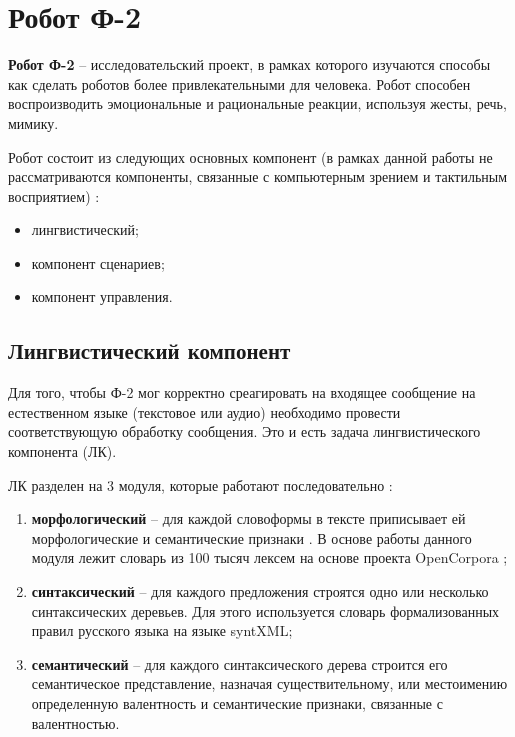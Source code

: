 \chapter{Робот Ф-2}

\textbf{Робот Ф-2} -- исследовательский проект, в рамках которого изучаются способы как сделать роботов более привлекательными для человека. Робот способен воспроизводить эмоциональные и рациональные реакции, используя жесты, речь, мимику. 

Робот состоит из следующих основных компонент (в рамках данной работы не рассматриваются компоненты, связанные с компьютерным зрением и тактильным восприятием) \cite{arch_of_the_robot}:

\begin{itemize}
	\item лингвистический;
	\item компонент сценариев;
	\item компонент управления.
\end{itemize}




\section{Лингвистический компонент}

Для того, чтобы Ф-2 мог корректно среагировать на входящее сообщение на естественном языке (текстовое или аудио) необходимо провести соответствующую обработку сообщения. Это и есть задача лингвистического компонента (ЛК).

ЛК разделен на 3 модуля, которые работают последовательно \cite{arch_of_the_robot}: 

\begin{enumerate}
	\item \textbf{морфологический} -- для каждой словоформы в тексте приписывает ей морфологические и семантические признаки \cite{arch_of_the_robot_2}. В основе работы данного модуля лежит словарь из 100 тысяч лексем на основе проекта OpenCorpora \cite{arch_of_the_robot_3};
	
	\item \textbf{синтаксический} -- для каждого предложения строятся одно или несколько синтаксических деревьев. Для этого используется словарь формализованных правил русского языка на языке syntXML;
	
	\item \textbf{семантический} -- для каждого синтаксического дерева строится его семантическое представление, назначая существительному, или местоимению определенную валентность и семантические признаки, связанные с валентностью.
\end{enumerate}


